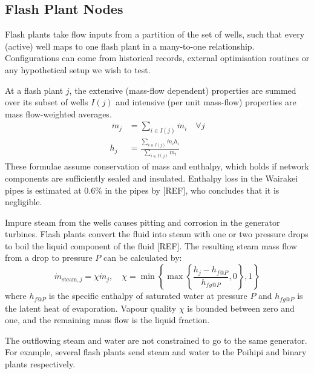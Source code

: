 \documentclass[a4paper, 12pt]{article}
\newlength{\drop}
\begin{document}
\subsection{Flash Plant Nodes}
Flash plants take flow inputs from a partition of the set of wells, such that every (active) well maps to one flash plant in a many-to-one relationship. Configurations can come from historical records, external optimisation routines or any hypothetical setup we wish to test.

At a flash plant $j$, the extensive (mass-flow dependent) properties are summed over its subset of wells $I(j)$ and intensive (per unit mass-flow) properties are mass flow-weighted averages.
\begin{align} \
\dot{m}_j &= \sum_{i\in I(j)} \dot{m}_i\quad \forall j \label{eq:fp_mf} \\
h_j &= \frac{\sum_{i\in I(j)} \dot{m}_i h_i}{\sum_{i\in I(j)} \dot{m}_i} \label{eq:fp_h}
\end{align}
These formulae assume conservation of mass and enthalpy, which holds if network components are sufficiently sealed and insulated. Enthalpy loss in the Wairakei pipes is estimated at 0.6\% in the pipes by [REF], who concludes that it is negligible.

Impure steam from the wells causes pitting and corrosion in the generator turbines. Flash plants convert the fluid into steam with one or two pressure drops to boil the liquid component of the fluid [REF]. The resulting steam mass flow from a drop to pressure $P$ can be calculated by:
\begin{equation}
\dot{m}_{\text{steam},j} = \chi\dot{m}_j,\quad \chi= \min{\left\{\max{\left\{\frac{h_j - h_{f@P}}{h_{fg@P}}, 0\right\}}, 1\right\}}
\end{equation}
where $h_{f@P}$ is the specific enthalpy of saturated water at pressure $P$ and $h_{fg@P}$ is the latent heat of evaporation. Vapour quality $\chi$ is bounded between zero and one, and the remaining mass flow is the liquid fraction.

The outflowing steam and water are not constrained to go to the same generator. For example, several flash plants send steam and water to the Poihipi and binary plants respectively.
\end{document}
